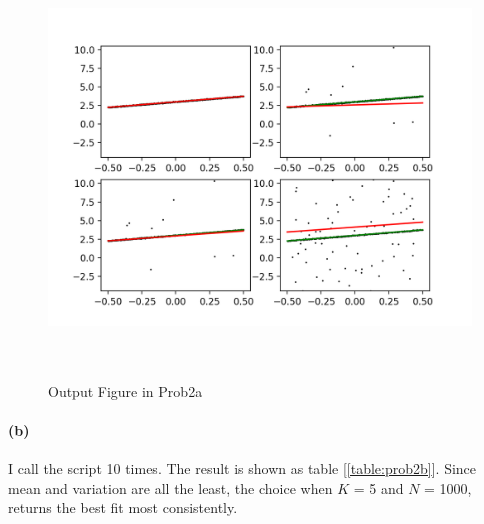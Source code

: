 \documentclass{article}
\newcommand{\spart}[1]{\paragraph{(#1)}}
\begin{document}
\begin{figure}[htbp]
  \centering
  \includegraphics[height = 30em]{./code/outputs/prob2a.png}
  \caption{Output Figure in Prob2a}
  \label{fig:prob2a}
\end{figure}

\spart{b} I call the script 10 times. The result is shown as table [\ref{table:prob2b}]. 
Since mean and variation are all the least, the choice when $K$ = 5 and $N$ = 1000, returns the best fit most consistently.
\end{document}
